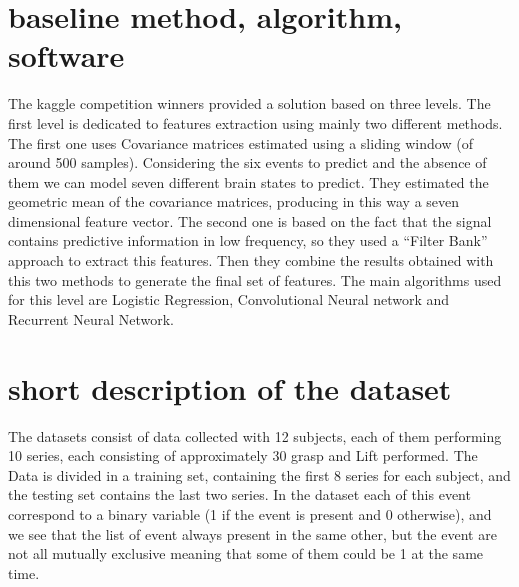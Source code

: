 \documentclass[final,leqno,onefignum,onetabnum]{siamltexmm}
\begin{document}
\section{baseline method, algorithm, software}
The kaggle competition winners\cite{kaggle} provided a solution based on three levels. The first level is dedicated to features extraction using mainly two different methods. The first one uses Covariance matrices  estimated using a sliding window (of around 500 samples). Considering the six events to predict and the absence of them we can model seven different brain states to predict. They estimated the geometric mean of the covariance matrices, producing in this way a seven dimensional feature vector. The second one is based on the fact that the signal contains predictive information in low frequency, so they used a ``Filter Bank'' approach to extract this features. Then they combine the results obtained with this two methods to generate the final set of features. 
The main algorithms used for this level are Logistic Regression, Convolutional Neural network and Recurrent Neural Network. 
 

\section{short description of the dataset}
The  datasets consist of data collected with 12 subjects, each of them performing 10 series, each consisting of approximately 30 grasp and Lift performed. The Data is divided in a  training set, containing the first 8 series for each subject, and  the testing set contains the last two series.
In the dataset each of this event correspond to a binary variable (1 if the event is present and 0 otherwise), and we see that the list of event always present in the same other, but the event are not all mutually exclusive meaning that some of  them could be 1 at the same time.  
 



\end{document}
